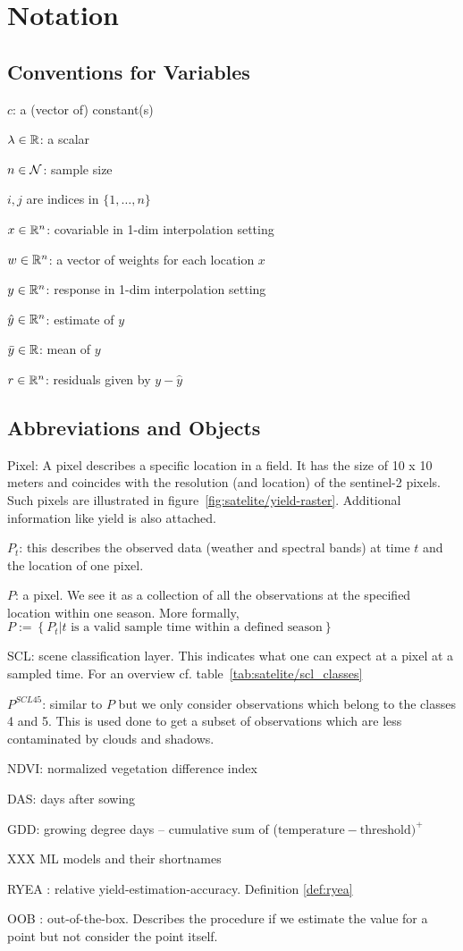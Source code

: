 \chapter*{Notation}
\label{c:Notation}

\section*{Conventions for Variables}
$c$: a (vector of) constant(s)

$\lambda \in \mathbb{R}$: a scalar

$n\in \operatorname{\mathcal{N}}$: sample size

$i,j$ are indices in $\{1,\dots,n\}$

$x\in \mathbb{R}^n$: covariable in 1-dim interpolation setting

$w \in \mathbb{R}^n$: a vector of weights for each location $x$

$y\in \mathbb{R}^n$: response in 1-dim interpolation setting

$\hat y\in \mathbb{R}^n$: estimate of $y$

$\bar y\in \mathbb{R}$: mean of $y$

$r \in \mathbb{R}^n$: residuals given by $y - \hat y$


\section*{Abbreviations and Objects}

Pixel: A pixel describes a specific location in a field. It has the size of 10 x 10 meters and coincides with the resolution (and location) of the sentinel-2 pixels. Such pixels are illustrated in figure~\ref{fig:satelite/yield-raster}. Additional information like yield is also attached.

$P_t$: this describes the observed data (weather and spectral bands) at time $t$ and the location of one pixel. 

$P$: a pixel. We see it as a collection of all the observations at the specified location within one season. More formally, $P := \left\{P_t | t\text{ is a valid sample time within a defined season}\right\}$

SCL: scene classification layer. This indicates what one can expect at a pixel at a sampled time. For an overview cf. table~\ref{tab:satelite/scl_classes}

$P^{SCL45}$: similar to $P$ but we only consider observations which belong to the classes 4 and 5. This is used done to get a subset of observations which are less contaminated by clouds and shadows.

NDVI: normalized vegetation difference index

DAS: days after sowing

GDD: growing degree days -- cumulative sum of ($\text{temperature}-\text{threshold})^+$

XXX ML models and their shortnames

RYEA : relative yield-estimation-accuracy. Definition \ref{def:ryea}

OOB : out-of-the-box. Describes the procedure if we estimate the value for a point but not consider the point itself.
